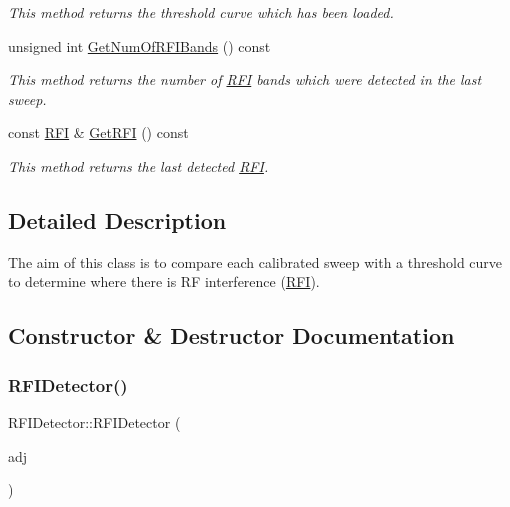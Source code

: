 \begin{DoxyCompactItemize}
\begin{DoxyCompactList}\small\item\em This method returns the threshold curve which has been loaded. \end{DoxyCompactList}\item 
\mbox{\label{classRFIDetector_a053ba4f21411a8671ff0a38f2a18d393}} 
unsigned int \hyperlink{classRFIDetector_a053ba4f21411a8671ff0a38f2a18d393}{Get\+Num\+Of\+R\+F\+I\+Bands} () const
\begin{DoxyCompactList}\small\item\em This method returns the number of \hyperlink{structRFI}{R\+FI} bands which were detected in the last sweep. \end{DoxyCompactList}\item 
\mbox{\label{classRFIDetector_ad50815b6e1004d2a6c15aef7deaca272}} 
const \hyperlink{structRFI}{R\+FI} \& \hyperlink{classRFIDetector_ad50815b6e1004d2a6c15aef7deaca272}{Get\+R\+FI} () const
\begin{DoxyCompactList}\small\item\em This method returns the last detected \hyperlink{structRFI}{R\+FI}. \end{DoxyCompactList}\end{DoxyCompactItemize}


\subsection{Detailed Description}
The aim of this class is to compare each calibrated sweep with a threshold curve to determine where there is RF interference (\hyperlink{structRFI}{R\+FI}). 

\subsection{Constructor \& Destructor Documentation}
\mbox{\label{classRFIDetector_a1943c00a5ab657a24cdacaf2b0d550f1}} 
\subsubsection{\texorpdfstring{R\+F\+I\+Detector()}{RFIDetector()}}
{\footnotesize\ttfamily R\+F\+I\+Detector\+::\+R\+F\+I\+Detector (\begin{DoxyParamCaption}\item[{\hyperlink{classCurveAdjuster}{Curve\+Adjuster} \&}]{adj }\end{DoxyParamCaption})\hspace{0.3cm}{\ttfamily [inline]}}




